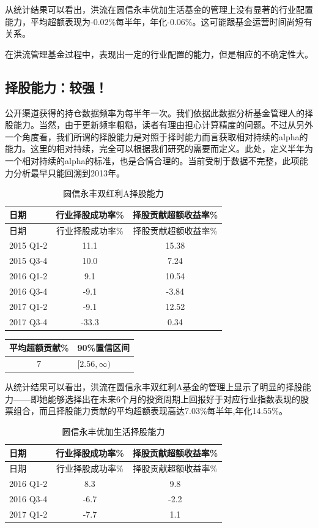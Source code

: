 \documentclass[hyperref,]{ctexart}
\begin{document}
从统计结果可以看出，洪流在圆信永丰优加生活基金的管理上没有显著的行业配置能力，平均超额表现为-0.02\%每半年，年化-0.06\%。这可能跟基金运营时间尚短有关系。

在洪流管理基金过程中，表现出一定的行业配置的能力，但是相应的不确定性大。

\subsection{择股能力：较强！}

公开渠道获得的持仓数据频率为每半年一次。我们依据此数据分析基金管理人的择股能力。当然，由于更新频率粗糙，读者有理由担心计算精度的问题。不过从另外一个角度看，我们所谓的择股能力是对照于择时能力而言获取相对持续的alpha的能力。这里的相对持续，完全可以根据我们研究的需要而定义。此处，定义半年为一个相对持续的alpha的标准，也是合情合理的。当前受制于数据不完整，此项能力分析最早只能回溯到2013年。

\begin{longtable}[]{@{}lcc@{}}
\caption{圆信永丰双红利A择股能力}\tabularnewline
\toprule
日期 & 行业择股成功率\% & 择股贡献超额收益率\%\tabularnewline
\midrule
\endfirsthead
\toprule
日期 & 行业择股成功率\% & 择股贡献超额收益率\%\tabularnewline
\midrule
\endhead
2015 Q1-2 & 11.1 & 15.38\tabularnewline
2015 Q3-4 & 10.0 & 7.24\tabularnewline
2016 Q1-2 & 9.1 & 10.54\tabularnewline
2016 Q3-4 & -9.1 & -3.84\tabularnewline
2017 Q1-2 & -9.1 & 12.52\tabularnewline
2017 Q3-4 & -33.3 & 0.34\tabularnewline
\bottomrule
\end{longtable}

\begin{longtable}[]{@{}cl@{}}
\toprule
平均超额贡献\% & 90\%置信区间\tabularnewline
\midrule
\endhead
7 & \([2.56,\infty)\)\tabularnewline
\bottomrule
\end{longtable}

从统计结果可以看出，洪流在圆信永丰双红利A基金的管理上显示了明显的择股能力------即她能够选择出在未来6个月的投资周期上回报好于对应行业指数表现的股票组合，而且择股能力贡献的平均超额表现高达7.03\%每半年,年化14.55\%。

\begin{longtable}[]{@{}lcc@{}}
\caption{圆信永丰优加生活择股能力}\tabularnewline
\toprule
日期 & 行业择股成功率\% & 择股贡献超额收益率\%\tabularnewline
\midrule
\endfirsthead
\toprule
日期 & 行业择股成功率\% & 择股贡献超额收益率\%\tabularnewline
\midrule
\endhead
2016 Q1-2 & 8.3 & 9.8\tabularnewline
2016 Q3-4 & -6.7 & -2.2\tabularnewline
2017 Q1-2 & -7.7 & 1.1\tabularnewline
\bottomrule
\end{longtable}
\end{document}
